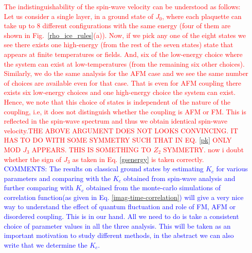 \indent\textcolor{red}{The indistinguishability of the spin-wave velocity can be understood as follows: Let us consider a single layer, in a ground state of $J_0$, where each plaquette can take up to 8 different configurations with the same energy (four of them are shown in Fig.~\ref{rho_ice_rules}(a)). Now, if we pick any one of the eight states we see there exists one high-energy (from the rest of the seven states) state that appears at finite temperatures or fields. And, six of the low-energy choice where the system can exist at low-temperatures (from the remaining six other choices). Similarly, we do the same analysis for the AFM case and we see the same number of choices are available even for that case. That is even for AFM coupling there exists six low-energy choices and one high-energy choice the system can exist. Hence, we note that this choice of states is independent of the nature of the coupling, i.e, it does not distinguish whether the coupling is AFM or FM. This is reflected in the spin-wave spectrum and thus we obtain identical spin-wave velocity.THE ABOVE ARGUMENT DOES NOT LOOKS CONVINCING. IT HAS TO DO WITH SOME SYMMETRY SUCH THAT IN EQ. \ref{pk} ONLY MOD $J_3$ APPEARS. THIS IS SOMETHING TO $Z_2$ SYMMETRY. now i doubt whether the sign of $J_3$ as taken in Eq. \ref{gsenergy} is taken correctly.}\\
\indent
\textcolor{blue}{COMMENTS:  The results on classical ground states by estimating $K_c$ for various parameters and comparing with the $K_c$ obtained from spin-wave analysis and further comparing with $K_c$ obtained from the monte-carlo simulations of correlation function(as given in Eq. \ref{imag-time-correlation}) will give a very nice way to understand the effect of quantum fluctuation and role of FM, AFM or disordered coupling. This is in our hand. All we need to do is take a consistent choice of parameter values in all the three analysis. This will be taken as an important motivation to study different methods, in the abstract we can also write that we determine the $K_c$.}
